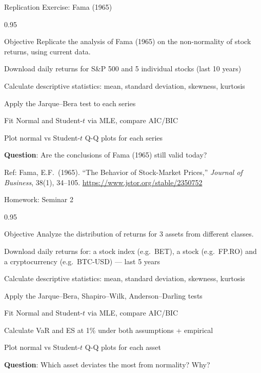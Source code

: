 \documentclass[9pt, aspectratio=169, t]{beamer}
\begin{document}
\begin{frame}{Replication Exercise: Fama (1965)}
    \begin{cminipage}{0.95\textwidth}
        \begin{block}{Objective}
            Replicate the analysis of Fama (1965) on the non-normality of stock returns, using current data.
        \end{block}
        \begin{enumerate}\setlength{\itemsep}{2pt}
            {\small
            \item Download daily returns for S\&P 500 and 5 individual stocks (last 10 years)
            \item Calculate descriptive statistics: mean, standard deviation, skewness, kurtosis
            \item Apply the Jarque--Bera test to each series
            \item Fit Normal and Student-$t$ via MLE, compare AIC/BIC
            \item Plot normal vs Student-$t$ Q-Q plots for each series
            \item \textbf{Question}: Are the conclusions of Fama (1965) still valid today?
            }
        \end{enumerate}
        {\tiny Ref: Fama, E.F.\ (1965). ``The Behavior of Stock-Market Prices,'' \textit{Journal of Business}, 38(1), 34--105. \url{https://www.jstor.org/stable/2350752}}
    \end{cminipage}
\end{frame}

\begin{frame}{Homework: Seminar 2}
\begin{cminipage}{0.95\textwidth}
    \begin{block}{Objective}
        Analyze the distribution of returns for 3 assets from different classes.
    \end{block}
    \begin{enumerate}\setlength{\itemsep}{2pt}
        {\small
        \item Download daily returns for: a stock index (e.g.\ BET), a stock (e.g.\ FP.RO) and a cryptocurrency (e.g.\ BTC-USD) --- last 5 years
        \item Calculate descriptive statistics: mean, standard deviation, skewness, kurtosis
        \item Apply the Jarque--Bera, Shapiro--Wilk, Anderson--Darling tests
        \item Fit Normal and Student-$t$ via MLE, compare AIC/BIC
        \item Calculate VaR and ES at 1\% under both assumptions + empirical
        \item Plot normal vs Student-$t$ Q-Q plots for each asset
        \item \textbf{Question}: Which asset deviates the most from normality? Why?
        }
    \end{enumerate}
\end{cminipage}
\end{frame}
\end{document}
